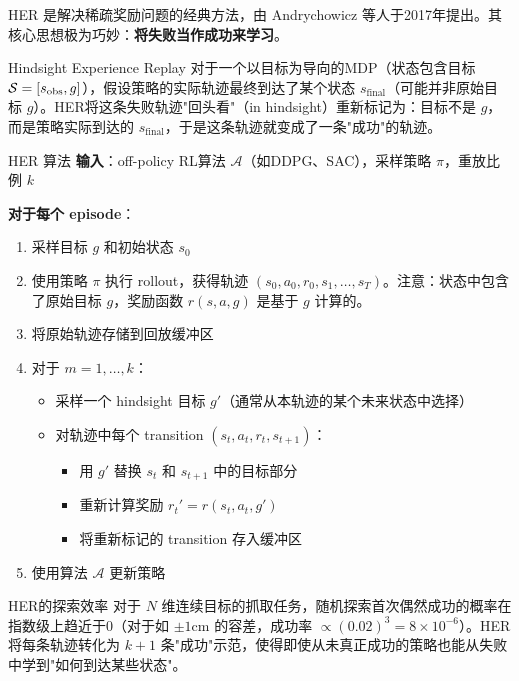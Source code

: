 HER 是解决稀疏奖励问题的经典方法，由 Andrychowicz 等人于2017年提出。其核心思想极为巧妙：\textbf{将失败当作成功来学习}。

\begin{mydefinition}{Hindsight Experience Replay}
对于一个以目标为导向的MDP（状态包含目标 $\mathcal{S} = [s_{\text{obs}}, g]$），假设策略的实际轨迹最终到达了某个状态 $s_{\text{final}}$（可能并非原始目标 $g$）。HER将这条失败轨迹"回头看"（in hindsight）重新标记为：目标不是 $g$，而是策略实际到达的 $s_{\text{final}}$，于是这条轨迹就变成了一条"成功"的轨迹。
\end{mydefinition}

\begin{myalgorithm}{HER 算法}
\textbf{输入}：off-policy RL算法 $\mathcal{A}$（如DDPG、SAC），采样策略 $\pi$，重放比例 $k$

\textbf{对于每个 episode}：
\begin{enumerate}
    \item 采样目标 $g$ 和初始状态 $s_0$
    \item 使用策略 $\pi$ 执行 rollout，获得轨迹 $(s_0, a_0, r_0, s_1, \ldots, s_T)$。注意：状态中包含了原始目标 $g$，奖励函数 $r(s, a, g)$ 是基于 $g$ 计算的。
    \item 将原始轨迹存储到回放缓冲区
    \item 对于 $m = 1, \ldots, k$：
    \begin{itemize}
        \item 采样一个 hindsight 目标 $g'$（通常从本轨迹的某个未来状态中选择）
        \item 对轨迹中每个 transition $(s_t, a_t, r_t, s_{t+1})$：
        \begin{itemize}
            \item 用 $g'$ 替换 $s_t$ 和 $s_{t+1}$ 中的目标部分
            \item 重新计算奖励 $r_t' = r(s_t, a_t, g')$
            \item 将重新标记的 transition 存入缓冲区
        \end{itemize}
    \end{itemize}
    \item 使用算法 $\mathcal{A}$ 更新策略
\end{enumerate}
\end{myalgorithm}

\begin{myTheorem}{HER的探索效率}
对于 $N$ 维连续目标的抓取任务，随机探索首次偶然成功的概率在指数级上趋近于0（对于如 $\pm 1\text{cm}$ 的容差，成功率 $\propto (0.02)^3 = 8\times 10^{-6}$）。HER将每条轨迹转化为 $k+1$ 条"成功"示范，使得即使从未真正成功的策略也能从失败中学到"如何到达某些状态"。
\end{myTheorem}

